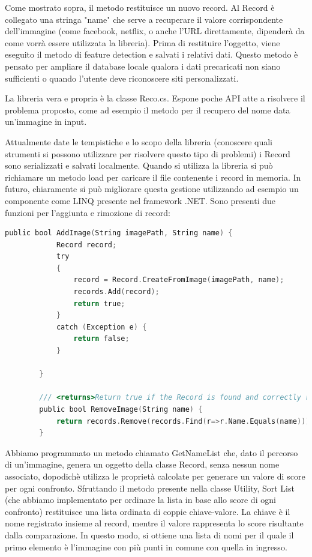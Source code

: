 \documentclass[twoside]{supsistudent}
\begin{document}
Come mostrato sopra, il metodo restituisce un nuovo record. Al Record è collegato una stringa "name" che serve a recuperare il valore corrispondente dell'immagine (come facebook, netflix, o anche l'URL direttamente, dipenderà da come vorrà essere utilizzata la libreria). Prima di restituire l'oggetto, viene eseguito il metodo di feature detection e salvati i relativi dati. Questo metodo è pensato per ampliare il database locale qualora i dati precaricati non siano sufficienti o quando l'utente deve riconoscere siti personalizzati. 

La libreria vera e propria è la classe Reco.cs. Espone poche API atte a risolvere il problema proposto, come ad esempio il metodo per il recupero del nome data un'immagine in input. 

Attualmente date le tempistiche e lo scopo della libreria (conoscere quali strumenti si possono utilizzare per risolvere questo tipo di problemi) i Record sono serializzati e salvati localmente. Quando si utilizza la libreria si può richiamare un metodo load per caricare il file contenente i record in memoria. In futuro, chiaramente si può migliorare questa gestione utilizzando ad esempio un componente come LINQ presente nel framework .NET.
Sono presenti due funzioni per l'aggiunta e rimozione di record:


\begin{lstlisting}[language=C]
public bool AddImage(String imagePath, String name) {
            Record record;
            try
            {
                record = Record.CreateFromImage(imagePath, name);
                records.Add(record);
                return true;
            }
            catch (Exception e) {
                return false;
            }
            
        }
        
        /// <returns>Return true if the Record is found and correctly removed from the repository, else false</returns>
        public bool RemoveImage(String name) {
            return records.Remove(records.Find(r=>r.Name.Equals(name)));
        }
\end{lstlisting}

Abbiamo programmato un metodo chiamato GetNameList che, dato il percorso di un'immagine, genera un oggetto della classe Record, senza nessun nome associato, dopodichè utilizza le proprietà calcolate per generare un valore di score per ogni confronto. Sfruttando il metodo presente nella classe Utility, Sort List (che abbiamo implementato per ordinare la lista in base allo score di ogni confronto) restituisce una lista ordinata di coppie chiave-valore. La chiave è il nome registrato insieme al record, mentre il valore rappresenta lo score risultante dalla comparazione. In questo modo, si ottiene una lista di nomi per il quale il primo elemento è l'immagine con più punti in comune con quella in ingresso. 
\end{document}
